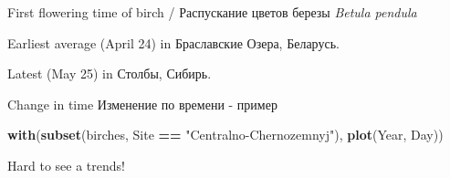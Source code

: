 \documentclass[9pt,ignorenonframetext,aspectratio=169]{beamer}
\newenvironment{Shaded}{\begin{snugshade}}{\end{snugshade}}
\newcommand{\DataTypeTok}[1]{\textcolor[rgb]{0.13,0.29,0.53}{#1}}
\newcommand{\KeywordTok}[1]{\textcolor[rgb]{0.13,0.29,0.53}{\textbf{#1}}}
\newcommand{\NormalTok}[1]{#1}
\newcommand{\OperatorTok}[1]{\textcolor[rgb]{0.81,0.36,0.00}{\textbf{#1}}}
\newcommand{\StringTok}[1]{\textcolor[rgb]{0.31,0.60,0.02}{#1}}
\begin{document}
\begin{frame}[fragile]{First flowering time of birch / Распускание
цветов березы \emph{Betula pendula}}
\protect\hypertarget{first-flowering-time-of-birch---}{}

\small

\begin{Shaded}
\end{Shaded}

\normalsize

Earliest average (April 24) in Браславские Озера, Беларусь.

Latest (May 25) in Столбы, Сибирь.

\end{frame}

\begin{frame}[fragile]{Change in time \textbar{} Изменение по времени -
пример}
\protect\hypertarget{change-in-time------}{}

\bc
\footnotesize

\begin{Shaded}
\begin{Highlighting}[]
\KeywordTok{with}\NormalTok{(}\KeywordTok{subset}\NormalTok{(birches, Site }\OperatorTok{==}\StringTok{ "Centralno-Chernozemnyj"}\NormalTok{), }\KeywordTok{plot}\NormalTok{(Year, Day))}
\end{Highlighting}
\end{Shaded}

Hard to see a trends! \ec

\end{frame}
\end{document}
